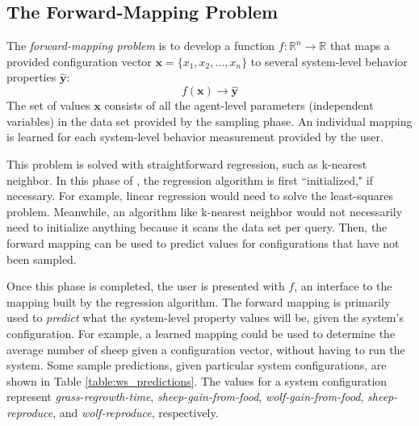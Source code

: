 \subsection{The Forward-Mapping Problem}



The \textit{forward-mapping problem} is to develop a function $f: \mathbb{R}^n \rightarrow \mathbb{R}$ that maps a provided configuration vector $\mathbf x = \{x_1, x_2, ..., x_n \}$ to several system-level behavior properties $\hat {\mathbf y}$:
\[f(\mathbf x) \rightarrow  \hat{\mathbf y}\]
The set of values $\mathbf x$ consists of all the agent-level parameters (independent variables) in the data set provided by the sampling phase.
An individual mapping is learned for each system-level behavior measurement provided by the user.

This problem is solved with straightforward regression, such as k-nearest neighbor.
In this phase of \fw, the regression algorithm is first ``initialized," if necessary.
For example, linear regression would need to solve the least-squares problem.
Meanwhile, an algorithm like k-nearest neighbor would not necessarily need to initialize anything because it scans the data set per query.
Then, the forward mapping can be used to predict values for configurations that have not been sampled.

Once this phase is completed, the user is presented with $f$, an interface to the mapping built by the regression algorithm.
The forward mapping is primarily used to \textit{predict} what the system-level property values will be, given the system's configuration.
For example, a learned mapping could be used to determine the average number of sheep given a configuration vector, without having to run the system.
Some sample predictions, given particular system configurations, are shown in Table \ref{table:ws_predictions}.
The values for a system configuration represent \textit{grass-regrowth-time}, \textit{sheep-gain-from-food}, \textit{wolf-gain-from-food}, \textit{sheep-reproduce}, and \textit{wolf-reproduce}, respectively.

